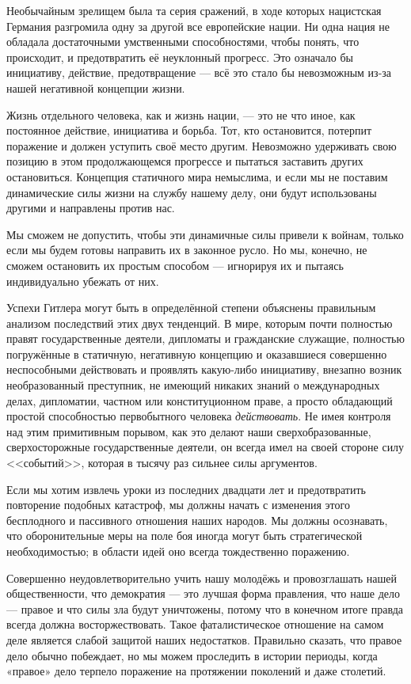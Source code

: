 Необычайным зрелищем была та серия сражений, в ходе которых нацистская Германия разгромила одну за другой все европейские нации. Ни одна нация не обладала достаточными умственными способностями, чтобы понять, что происходит, и предотвратить её неуклонный прогресс. Это означало бы инициативу, действие, предотвращение — всё это стало бы невозможным из-за нашей негативной концепции жизни.

Жизнь отдельного человека, как и жизнь нации, — это не что иное, как постоянное действие, инициатива и борьба. Тот, кто остановится, потерпит поражение и должен уступить своё место другим. Невозможно удерживать свою позицию в этом продолжающемся прогрессе и пытаться заставить других остановиться. Концепция статичного мира немыслима, и если мы не поставим динамические силы жизни на службу нашему делу, они будут использованы другими и направлены против нас.
 
Мы сможем не допустить, чтобы эти динамичные силы привели к войнам, только если мы будем готовы направить их в законное русло. Но мы, конечно, не сможем остановить их простым способом — игнорируя их и пытаясь индивидуально убежать от них.

Успехи Гитлера могут быть в определённой степени объяснены правильным анализом последствий этих двух тенденций. В мире, которым почти полностью правят государственные деятели, дипломаты и гражданские служащие, полностью погружённые в статичную, негативную концепцию и оказавшиеся совершенно неспособными действовать и проявлять какую-либо инициативу, внезапно возник необразованный преступник, не имеющий никаких знаний о международных делах, дипломатии, частном или конституционном праве, а просто обладающий простой способностью первобытного человека \textit{действовать}. Не имея контроля над этим примитивным порывом, как это делают наши сверхобразованные, сверхосторожные государственные деятели, он всегда имел на своей стороне силу <<событий>>, которая в тысячу раз сильнее силы аргументов.
 
Если мы хотим извлечь уроки из последних двадцати лет и предотвратить повторение подобных катастроф, мы должны начать с изменения этого бесплодного и пассивного отношения наших народов. Мы должны осознавать, что оборонительные меры на поле боя иногда могут быть стратегической необходимостью; в области идей оно всегда тождественно поражению.

Совершенно неудовлетворительно учить нашу молодёжь и провозглашать нашей общественности, что демократия — это лучшая форма правления, что наше дело — правое и что силы зла будут уничтожены, потому что в конечном итоге правда всегда должна восторжествовать. Такое фаталистическое отношение на самом деле является слабой защитой наших недостатков. Правильно сказать, что правое дело обычно побеждает, но мы можем проследить в истории периоды, когда «правое» дело терпело поражение на протяжении поколений и даже столетий.
 
